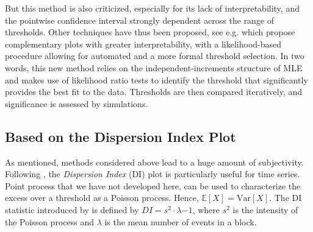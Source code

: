 But this method is also criticized, especially for its lack of interpretability, and the pointwise confidence interval strongly dependent across the range of thresholds.
Other techniques have thus been proposed, see e.g. \citet{Wadsworth_exploiting_2016} which propose complementary plots with greater interpretability, with a likelihood-based procedure allowing for automated and a more formal threshold selection.
In two words, this new method relies on the independent-increments
structure of MLE and makes use of likelihood ratio tests to identify the threshold that significantly provides the best fit to the data. Thresholds are then compared iteratively, and significance is assessed by simulations.






\subsection*{Based on the Dispersion Index Plot}

As mentioned, methods considered above lead to a huge amount of subjectivity.
Following \citet{ribatet_users_2006}, the \emph{Dispersion Index} (DI) plot is particularly useful for time series. Point process that we have not developed here, can be used to characterize the excess over a threshold as a Poisson process. Hence, $\mathbb{E}[X]=\text{Var}[X]$.  The DI statistic introduced by \cite{cunnane_note_1979} is 
defined by $DI=s^2\cdot\lambda{-1}$, where $s^2$ is the intensity of the Poisson process and $\lambda$ is the mean number of events in a block.


